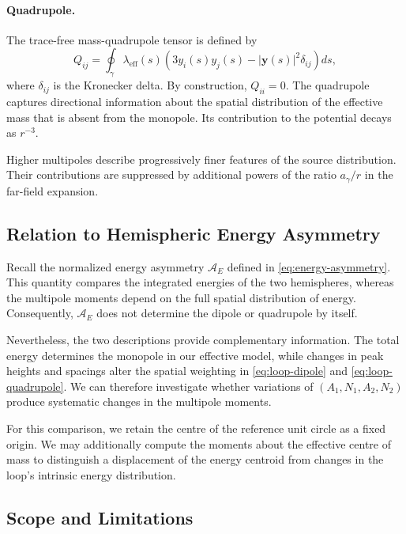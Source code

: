 \documentclass{article}
\numberwithin{tm}{section}
\numberwithin{dn}{section}
\numberwithin{as}{section}
\numberwithin{rk}{section}
\numberwithin{lem}{section}
\numberwithin{ax}{section}
\numberwithin{pp}{section}
\numberwithin{eg}{section}
\numberwithin{war}{section}
\numberwithin{equation}{section}
\numberwithin{prop}{section}
\numberwithin{nt}{section}
\numberwithin{rc}{section}
\begin{document}
\paragraph{Quadrupole.}
The trace-free mass-quadrupole tensor is defined by
\begin{equation}
	\label{eq:loop-quadrupole}
	Q_{ij}
	=
	\oint_\gamma
	\lambda_{\mathrm{eff}}(s)
	\left(
	3y_i(s)y_j(s)
	-|\mathbf{y}(s)|^2\delta_{ij}
	\right)ds,
\end{equation}
where $\delta_{ij}$ is the Kronecker delta. By construction,
$Q_{ii}=0$. The quadrupole captures directional information
about the spatial distribution of the effective mass that
is absent from the monopole. Its contribution to the
potential decays as $r^{-3}$.

Higher multipoles describe progressively finer features of
the source distribution. Their contributions are suppressed
by additional powers of the ratio $a_\gamma/r$ in the
far-field expansion.

\subsection{Relation to Hemispheric Energy Asymmetry}

Recall the normalized energy asymmetry
$\mathcal{A}_E$ defined in
\eqref{eq:energy-asymmetry}. This quantity compares the
integrated energies of the two hemispheres, whereas the
multipole moments depend on the full spatial distribution
of energy. Consequently, $\mathcal{A}_E$ does not determine
the dipole or quadrupole by itself.

Nevertheless, the two descriptions provide complementary
information. The total energy determines the monopole in
our effective model, while changes in peak heights and
spacings alter the spatial weighting in
\eqref{eq:loop-dipole} and \eqref{eq:loop-quadrupole}.
We can therefore investigate whether variations of
$(A_1,N_1,A_2,N_2)$ produce systematic changes in the
multipole moments.

For this comparison, we retain the centre of the reference
unit circle as a fixed origin. We may additionally compute
the moments about the effective centre of mass to distinguish
a displacement of the energy centroid from changes in the
loop's intrinsic energy distribution.

\subsection*{Scope and Limitations}
\end{document}

